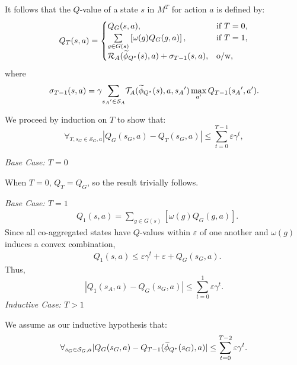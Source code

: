 It follows that the $Q$-value of a state $s$ in $M^T$ for action $a$ is defined by:
\begin{equation}
Q_T(s, a) = 
\begin{cases}
	   Q_G(s, a), &  \text{if } T=0,\\
	   \underset{g \in G(s)}{\sum} \left[ \omega(g)Q_G(g,a) \right], & \text{if } T = 1,\\
	   \mathcal{R}_A(\widetilde \phi_{Q^*}(s),a) + \sigma_{T-1}(s,a), &\text{o/w},
\end{cases}
\end{equation}
where
\begin{equation*}
\sigma_{T-1}(s,a) = \gamma \underset{{s_A}' \in \mathcal{S}_A}{\sum} \mathcal{T}_A(\widetilde \phi_{Q^*}(s),a,{s_A}') \max_{a'} Q_{T-1}({s_A}', a').
\end{equation*}

We proceed by induction on $T$ to show that:
\begin{equation}
\label{eq:clm1Induct}
\forall_{T, s_G \in \mathcal{S}_G, a} |Q_G(s_G, a) - Q_T(s_G, a)| \leq \sum_{t=0}^{T-1} \varepsilon \gamma^{t},
\end{equation}

\textit{Base Case: $T = 0$}

When $T = 0$, $Q_T = Q_G$, so the result trivially follows.

\textit{Base Case: $T = 1$}
\begin{align*}
&Q_1(s,a) = \underset{g \in G(s)}{\sum} \left[ \omega(g)Q_G(g,a) \right].
\end{align*}
Since all co-aggregated states have $Q$-values within $\varepsilon$ of one another and $\omega(g)$ induces a convex combination,
\begin{align*}
&Q_1(s,a) \leq \varepsilon \gamma^t + \varepsilon + Q_G(s_G, a).
\end{align*}
Thus,
\begin{equation}
\left| Q_{1}(s_A, a) - Q_G(s_G,a) \right| \leq \sum_{t=0}^{1}\varepsilon \gamma^t.
\end{equation}
\textit{Inductive Case: $T > 1$}

We assume as our inductive hypothesis that:
\begin{equation*}
\forall_{s_G \in \mathcal{S}_G, a} |Q_G(s_G, a) - Q_{T-1}(\widetilde \phi_{Q^*}(s_G), a)| \leq \sum_{t=0}^{T-2} \varepsilon \gamma^t.
\end{equation*}

